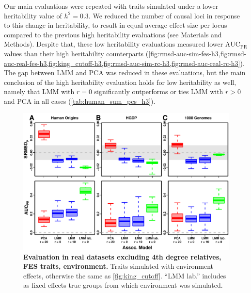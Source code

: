 \documentclass[11pt]{article}
\newcommand{\auc}{\text{AUC}_\text{PR}}
\begin{document}
\begin{linenumbers}
Our main evaluations were repeated with traits simulated under a lower heritability value of $h^2 = 0.3$.
We reduced the number of causal loci in response to this change in heritability, to result in equal average effect size per locus compared to the previous high heritability evaluations (see Materials and Methods).
Despite that, these low heritability evaluations measured lower $\auc$ values than their high heritability counterparts (\cref{fig:rmsd-auc-sim-fes-h3,fig:rmsd-auc-real-fes-h3,fig:king_cutoff-h3,fig:rmsd-auc-sim-rc-h3,fig:rmsd-auc-real-rc-h3}).
The gap between LMM and PCA was reduced in these evaluations, but the main conclusion of the high heritability evaluation holds for low heritability as well, namely that LMM with $r=0$ significantly outperforms or ties LMM with $r > 0$ and PCA in all cases (\cref{tab:human_sum_pcs_h3}).

\begin{figure}[hp]
  \centering
  \includegraphics[width=\textwidth]{fes/m_causal_fac-27/h0.3/env0.3-0.2/rmsd-auc_king-cutoff-4.pdf}
  \caption{
    {\bf Evaluation in real datasets excluding 4th degree relatives, FES traits, environment.}
    Traits simulated with environment effects, otherwise the same as \cref{fig:king_cutoff}.
    ``LMM lab.'' includes as fixed effects true groups from which environment was simulated.
  }
  \label{fig:king_cutoff-env}
\end{figure}


\end{linenumbers}
\end{document}
